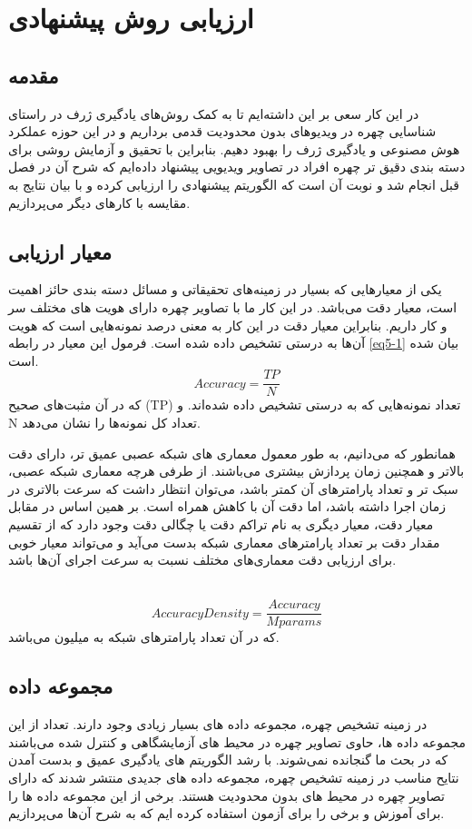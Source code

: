 \chapter{ارزیابی روش پیشنهادی}
\section{مقدمه}

در این کار سعی بر این داشته‌ایم تا به کمک روش‌های یادگیری ژرف در راستای شناسایی چهره در ویدیوهای بدون محدودیت قدمی برداریم و در این حوزه عملکرد هوش مصنوعی و یادگیری ژرف را بهبود دهیم. بنابراین با تحقیق و آزمایش روشی برای دسته بندی دقیق تر چهره افراد در تصاویر ویدیویی پیشنهاد داده‌ایم که شرح آن در فصل قبل انجام شد و نوبت آن است که الگوریتم پیشنهادی را ارزیابی کرده و با بیان نتایج به مقایسه با کارهای دیگر می‌پردازیم.
\section{معیار ارزیابی}

یکی از معیارهایی که بسیار در زمینه‌های تحقیقاتی و مسائل دسته بندی حائز اهمیت است، معیار دقت می‌باشد. در این کار ما با تصاویر چهره دارای هویت های مختلف سر و کار داریم. بنابراین معیار دقت در این کار به معنی درصد نمونه‌هایی است که هویت آن‌ها به درستی تشخیص داده شده است. فرمول این معیار در رابطه \ref{eq5-1} بیان شده است.
\begin{equation}\label{eq5-1}
Accuracy= \frac{TP}{N}
\end{equation}
که در آن 	مثبت‌های صحیح (TP) تعداد نمونه‌هایی که به درستی تشخیص داده شده‌اند. و N تعداد کل نمونه‌ها را نشان می‌دهد.

همانطور که می‌دانیم، به طور معمول معماری های شبکه عصبی عمیق تر، دارای دقت بالاتر و همچنین زمان پردازش بیشتری می‌باشند. از طرفی هرچه معماری شبکه عصبی، سبک تر و تعداد پارامترهای آن کمتر باشد، می‌توان انتظار داشت که سرعت بالاتری در زمان اجرا داشته باشد، اما دقت آن با کاهش همراه است. بر همین اساس در مقابل معیار دقت، معیار دیگری به نام تراکم دقت یا چگالی دقت وجود دارد که از تقسیم مقدار دقت بر تعداد پارامترهای معماری شبکه بدست می‌آید و می‌تواند معیار خوبی برای ارزیابی دقت معماری‌های مختلف نسبت به سرعت اجرای آن‌ها باشد.

‌\begin{equation}\label{eq5-2}
Accuracy Density = \frac{Accuracy}{Mparams}
\end{equation}
که در آن  تعداد پارامترهای شبکه به میلیون می‌باشد.
\section{مجموعه داده}
در زمینه تشخیص چهره، مجموعه داده های بسیار زیادی وجود دارند. تعداد از این مجموعه داده ها، حاوی تصاویر چهره در محیط های آزمایشگاهی و کنترل شده می‌باشند که در بحث ما گنجانده نمی‌شوند. با رشد الگوریتم های یادگیری عمیق و بدست آمدن نتایح مناسب در زمینه تشخیص چهره، مجموعه داده های جدیدی منتشر شدند که دارای تصاویر چهره در محیط های بدون محدودیت هستند. برخی از این مجموعه داده ها را برای آموزش و برخی را برای آزمون استفاده کرده ایم که به شرح آن‌ها می‌پردازیم.
